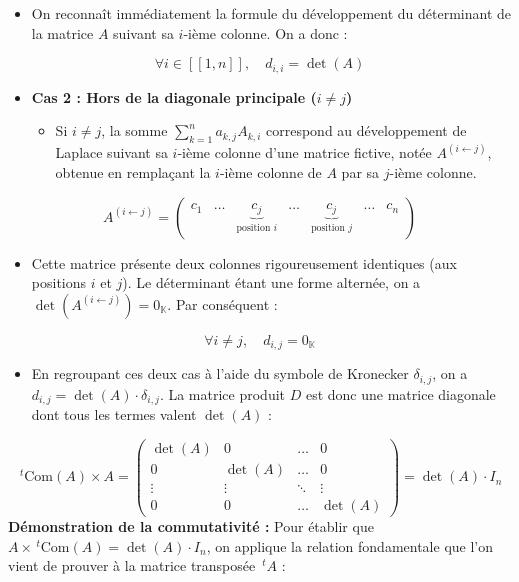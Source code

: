 \documentclass[11pt, a4paper]{article}
\theoremstyle{definition}
\begin{document}
\begin{itemize}
\item On reconnaît immédiatement la formule du développement du déterminant de la matrice $A$ suivant sa $i$-ième colonne. On a donc :
\end{itemize}
\[
\forall i \in [\![1,n]\!], \quad d_{i,i} = \det(A)
\]
\begin{itemize}
\item \textbf{Cas 2 : Hors de la diagonale principale ($i \neq j$)}
\begin{itemize}
\item Si $i \neq j$, la somme $\sum_{k=1}^n a_{k,j} A_{k,i}$ correspond au développement de Laplace suivant sa $i$-ième colonne d'une matrice fictive, notée $A^{(i \leftarrow j)}$, obtenue en remplaçant la $i$-ième colonne de $A$ par sa $j$-ième colonne.
\end{itemize}
\end{itemize}
\[
A^{(i \leftarrow j)} = \begin{pmatrix} c_1 & \dots & \underbrace{c_j}_{\text{position } i} & \dots & \underbrace{c_j}_{\text{position } j} & \dots & c_n \end{pmatrix}
\]
\begin{itemize}
\item Cette matrice présente deux colonnes rigoureusement identiques (aux positions $i$ et $j$). Le déterminant étant une forme alternée, on a $\det(A^{(i \leftarrow j)}) = 0_\mathbb{K}$. Par conséquent :
\end{itemize}
\[
\forall i \neq j, \quad d_{i,j} = 0_\mathbb{K}
\]
\begin{itemize}
\item En regroupant ces deux cas à l'aide du symbole de Kronecker $\delta_{i,j}$, on a $d_{i,j} = \det(A) \cdot \delta_{i,j}$. La matrice produit $D$ est donc une matrice diagonale dont tous les termes valent $\det(A)$ :
\end{itemize}
\[
\,^t\mathrm{Com}(A) \times A = \begin{pmatrix} \det(A) & 0 & \dots & 0 \\ 0 & \det(A) & \dots & 0 \\ \vdots & \vdots & \ddots & \vdots \\ 0 & 0 & \dots & \det(A) \end{pmatrix} = \det(A) \cdot I_n
\]
\textbf{Démonstration de la commutativité :}
Pour établir que $A \times \,^t\mathrm{Com}(A) = \det(A) \cdot I_n$, on applique la relation fondamentale que l'on vient de prouver à la matrice transposée $\,^tA$ :
\end{document}
